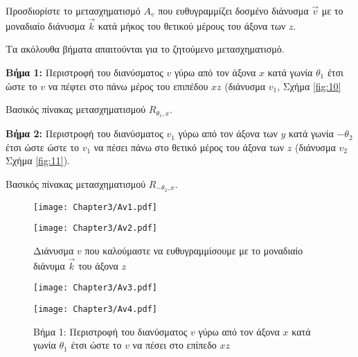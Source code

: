 \begin{example}
Προσδιορίστε το μετασχηματισμό $A_v$ που ευθυγραμμίζει δοσμένο διάνυσμα $\vec{v}$ με το μοναδιαίο διάνυσμα $\vec{k}$ κατά μήκος του θετικού μέρους του άξονα των $z$.

\end{example}

\begin{solution}
	Τα ακόλουθα βήματα απαιτούνται για το ζητούμενο μετασχηματισμό. 
	
\textbf{Βήμα 1:} Περιστροφή του διανύσματος $v$ γύρω από τον άξονα $x$ κατά γωνία $\theta_1$ έτσι ώστε το $v$ να πέφτει στο πάνω μέρος του επιπέδου $xz$ (διάνυσμα $v_1$, Σχήμα \ref{fig:10}

\begin{center}
	Βασικός πίνακας μετασχηματισμού $R_{\theta_1, x}$.
\end{center}

\textbf{Βήμα 2:} Περιστροφή του διανύσματος $v_1$ γύρω από τον άξονα των $y$ κατά γωνία $-\theta_2$ έτσι ώστε ώστε το $v_1$ να πέσει πάνω στο θετικό μέρος του άξονα των $z$ (διάνυσμα $v_2$ Σχήμα \ref{fig:11}).

\begin{center}
	Βασικός πίνακας μετασχηματισμού $R_{-\theta_2, x}$.
\end{center}


\begin{figure}[h!]
	\begin{center}
		\begin{minipage}[b]{0.48\textwidth} %
		    \texttt{[image: Chapter3/Av1.pdf]}
		\end{minipage}%
	\hfill
		\begin{minipage}[b]{0.48\textwidth} %
		    \texttt{[image: Chapter3/Av2.pdf]}
		\end{minipage}
	\end{center}
	\caption{Διάνυσμα $v$ που καλούμαστε να ευθυγραμμίσουμε με το μοναδιαίο διάνυμα $\vec{k}$ του άξονα $z$}
\end{figure}


\begin{figure}[h!]
	\begin{center}
		\begin{minipage}[b]{0.48\textwidth} %
		    \texttt{[image: Chapter3/Av3.pdf]}
		\end{minipage}%
	\hfill
		\begin{minipage}[b]{0.48\textwidth} %
		    \texttt{[image: Chapter3/Av4.pdf]}
		\end{minipage}
	\end{center}
	\caption{Βήμα 1: Περιστροφή του διανύσματος $v$ γύρω από τον άξονα $x$ κατά γωνία $\theta_1$ έτσι ώστε το $v$ να πέσει στο επίπεδο $xz$}
\end{figure}



\end{solution}
